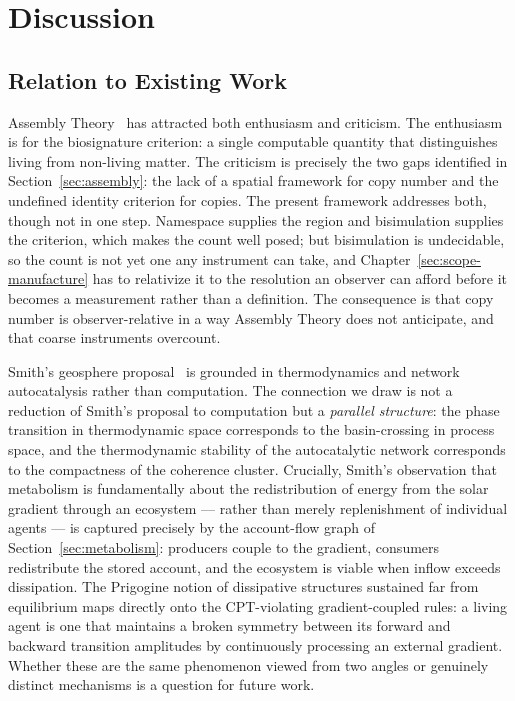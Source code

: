 \chapter{Discussion}
\label{sec:origins-discussion}

\section{Relation to Existing Work}

Assembly Theory~\cite{cronin2023assembly} has attracted both
enthusiasm and criticism.
The enthusiasm is for the biosignature criterion: a single
computable quantity that distinguishes living from non-living matter.
The criticism is precisely the two gaps identified in
Section~\ref{sec:assembly}: the lack of a spatial framework for
copy number and the undefined identity criterion for copies.
The present framework addresses both, though not in one step.
Namespace supplies the region and bisimulation supplies the criterion,
which makes the count well posed; but bisimulation is undecidable, so
the count is not yet one any instrument can take, and
Chapter~\ref{sec:scope-manufacture} has to relativize it to the
resolution an observer can afford before it becomes a measurement rather
than a definition.
The consequence is that copy number is observer-relative in a way
Assembly Theory does not anticipate, and that coarse instruments
overcount.

Smith's geosphere proposal~\cite{smith2016origin} is grounded in
thermodynamics and network autocatalysis rather than computation.
The connection we draw is not a reduction of Smith's proposal to
computation but a \emph{parallel structure}: the phase transition
in thermodynamic space corresponds to the basin-crossing in
process space, and the thermodynamic stability of the autocatalytic
network corresponds to the compactness of the coherence cluster.
Crucially, Smith's observation that metabolism is fundamentally
about the redistribution of energy from the solar gradient through
an ecosystem --- rather than merely replenishment of individual
agents --- is captured precisely by the account-flow graph of
Section~\ref{sec:metabolism}: producers couple to the gradient,
consumers redistribute the stored account, and the ecosystem is
viable when inflow exceeds dissipation.
The Prigogine notion of dissipative structures sustained far from
equilibrium maps directly onto the CPT-violating gradient-coupled
rules: a living agent is one that maintains a broken symmetry
between its forward and backward transition amplitudes by
continuously processing an external gradient.
Whether these are the same phenomenon viewed from two angles or
genuinely distinct mechanisms is a question for future work.

